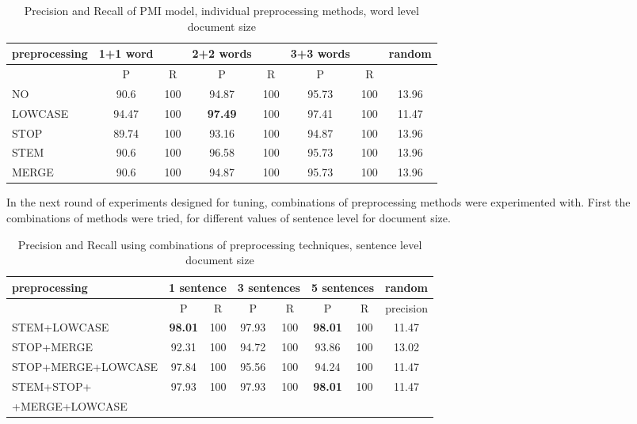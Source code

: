 \begin{table}[h!]
\begin{tabular}{ l | c c | c c | c c | c}
   preprocessing &  1+1 word && 2+2 words && 3+3 words && random\\
\hline
	& P  &  R & P  &  R & P  &  R &\\
\hline\hline
NO  & 90.6 & 100 & 94.87 & 100 & 95.73 & 100 & 13.96 \\
LOWCASE  & 94.47 & 100 & \textbf{97.49} & 100 & 97.41 & 100 & 11.47  \\
STOP  & 89.74 & 100 & 93.16 & 100 & 94.87 & 100 & 13.96 \\
STEM  & 90.6 & 100 & 96.58 & 100 & 95.73 & 100 & 13.96\\
 MERGE  & 90.6 & 100 & 94.87 & 100 & 95.73 & 100 & 13.96 \\
\end{tabular}
\caption{Precision and Recall of PMI model, individual preprocessing methods, word level document size}
\end{table}

In the next round of experiments designed for tuning, combinations of preprocessing methods were experimented 
with. First the combinations of methods were tried, for different values of sentence level for document size.
 \begin{table}[h!]
\begin{small}
\begin{tabular}{ l | c c | c c | c c | c}
preprocessing & \multicolumn{2}{l|}{1 sentence} & \multicolumn{2}{l|}{3 sentences} & \multicolumn{2}{l|}{5 sentences} & random\\
\hline
	& P  &  R & P  &  R & P  &  R & precision\\
\hline\hline
 STEM+LOWCASE  & \textbf{98.01} & 100 & 97.93 & 100 & \textbf{98.01} & 100 & 11.47\\
STOP+MERGE  & 92.31 & 100 & 94.72 & 100 & 93.86 & 100 & 13.02 \\
STOP+MERGE+LOWCASE  & 97.84 & 100 & 95.56 & 100 & 94.24 & 100 &11.47\\
STEM+STOP+& 97.93 & 100 & 97.93 & 100 & \textbf{98.01} & 100 & 11.47 \\
+MERGE+LOWCASE  &&&&&&&\\
\end{tabular}
\caption{Precision and Recall using combinations of preprocessing techniques, sentence level document size}
\end{small}
\end{table}

